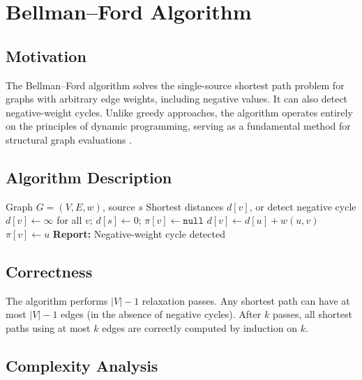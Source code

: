 \documentclass[12pt, a4paper, oneside]{report}
\theoremstyle{definition}
\begin{document}
\section{Bellman–Ford Algorithm}

\subsection{Motivation}

The Bellman–Ford algorithm \citep{bellman1958} solves the single-source shortest path problem for graphs with arbitrary edge weights, including negative values. It can also detect negative-weight cycles. Unlike greedy approaches, the algorithm operates entirely on the principles of dynamic programming, serving as a fundamental method for structural graph evaluations \citep{korte2018}.

\subsection{Algorithm Description}

\begin{algorithm}[H]
\caption{Bellman–Ford Algorithm}
\label{alg:bellmanford}
\begin{algorithmic}[1]
\Require Graph $G = (V, E, w)$, source $s$
\Ensure Shortest distances $d[v]$, or detect negative cycle
\State $d[v] \gets \infty$ for all $v$; $d[s] \gets 0$; $\pi[v] \gets \texttt{null}$
            \State $d[v] \gets d[u] + w(u,v)$
            \State $\pi[v] \gets u$
        \EndIf
    \EndFor
\EndFor
{} 
        \State \textbf{Report:} Negative-weight cycle detected
    \EndIf
\EndFor
\end{algorithmic}
\end{algorithm}

\subsection{Correctness}

The algorithm performs $|V|-1$ relaxation passes. Any shortest path can have at most $|V|-1$ edges (in the absence of negative cycles). After $k$ passes, all shortest paths using at most $k$ edges are correctly computed by induction on $k$.

\subsection{Complexity Analysis}
\end{document}
